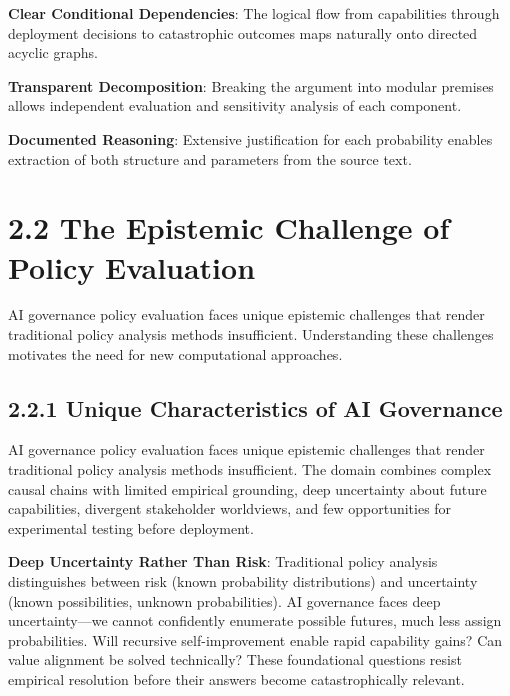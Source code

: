 \documentclass[
  11pt,
  letterpaper,
]{book}
\begin{document}
\textbf{Clear Conditional Dependencies}: The logical flow from
capabilities through deployment decisions to catastrophic outcomes maps
naturally onto directed acyclic graphs.

\textbf{Transparent Decomposition}: Breaking the argument into modular
premises allows independent evaluation and sensitivity analysis of each
component.

\textbf{Documented Reasoning}: Extensive justification for each
probability enables extraction of both structure and parameters from the
source text.

\section*{2.2 The Epistemic Challenge of Policy
Evaluation}\label{sec-epistemic-challenge}


AI governance policy evaluation faces unique epistemic challenges that
render traditional policy analysis methods insufficient. Understanding
these challenges motivates the need for new computational approaches.

\subsection*{2.2.1 Unique Characteristics of AI
Governance}\label{sec-ai-governance-unique}

AI governance policy evaluation faces unique epistemic challenges that
render traditional policy analysis methods insufficient. The domain
combines complex causal chains with limited empirical grounding, deep
uncertainty about future capabilities, divergent stakeholder worldviews,
and few opportunities for experimental testing before deployment.

\textbf{Deep Uncertainty Rather Than Risk}: Traditional policy analysis
distinguishes between risk (known probability distributions) and
uncertainty (known possibilities, unknown probabilities). AI governance
faces deep uncertainty---we cannot confidently enumerate possible
futures, much less assign probabilities. Will recursive self-improvement
enable rapid capability gains? Can value alignment be solved
technically? These foundational questions resist empirical resolution
before their answers become catastrophically relevant.
\end{document}
